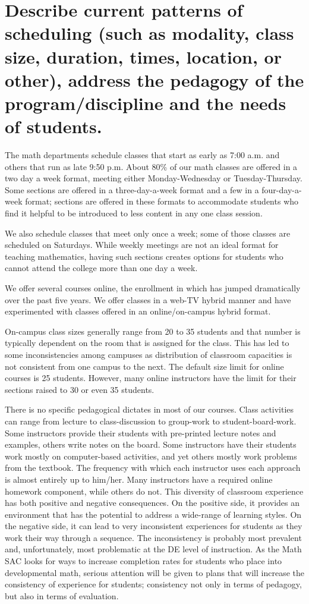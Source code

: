 \section{Describe current patterns of scheduling (such as modality, class size, duration, times, location, or other),  address the pedagogy of the program/discipline and the needs of students.} 
The math departments schedule classes that start as early as 7:00 a.m. and others that run as late 9:50 p.m.  About 80\% of our math classes are offered in a two day a week format, meeting either Monday-Wednesday or Tuesday-Thursday.  Some sections are offered in a three-day-a-week format and a few in a four-day-a-week format; sections are offered in these formats to accommodate students who find it helpful to be introduced to less content in any one class session.  

We also schedule classes that meet only once a week; some of those classes are scheduled on  Saturdays.   While weekly meetings are not an ideal format for teaching mathematics, having such sections creates options for students who cannot attend the college more than one day a week.  

We offer several courses online, the enrollment in which has jumped dramatically over the past five years.  We offer classes in a web-TV hybrid manner and have experimented with classes offered in an online/on-campus hybrid format.

On-campus class sizes generally range from 20 to 35 students and that number is typically dependent on the room that is assigned for the class.  This has led to some inconsistencies among campuses as distribution of classroom capacities is not consistent from one campus to the next.   The default size limit for online courses is 25 students.  However, many online instructors have the limit for their sections raised to 30 or even 35 students. 

There is no specific pedagogical dictates in most of our courses.  Class activities can range from lecture to class-discussion to group-work to student-board-work. Some instructors provide their students with pre-printed lecture notes and examples, others write notes on the board. Some instructors have their students work mostly on computer-based activities, and yet others mostly work problems from the textbook. The frequency with which each instructor uses each approach is almost entirely up to him/her.  Many instructors have a required online homework component, while others do not.  This diversity of classroom experience has both positive and negative consequences.  On the positive side, it provides an environment that has the potential to address a wide-range of learning styles.  On the negative side, it can lead to very inconsistent experiences for students as they work their way through a sequence.  The inconsistency is probably most prevalent and, unfortunately, most  problematic at the DE level of instruction.  As the Math SAC looks for ways to increase completion rates for students who place into developmental math, serious attention will be given to plans that will increase the consistency of experience for students; consistency not only in terms of pedagogy, but also in terms of evaluation.
